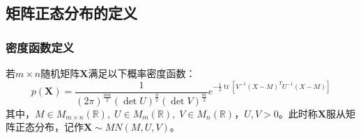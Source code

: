 \subsection{矩阵正态分布的定义}
\subsubsection{密度函数定义}
\begin{definition}\label{def:MatNormal1}
	若$m\times n$随机矩阵$\mathbf{X}$满足以下概率密度函数：
	\begin{equation*}
		p(\mathbf{X})=\frac{1}{(2\pi)^{\frac{mn}{2}}(\det U)^{\frac{n}{2}}(\det V)^{\frac{m}{2}}}e^{-\frac{1}{2}\operatorname{tr}[V^{-1}(X-M)^TU^{-1}(X-M)]}
	\end{equation*}
	其中，$M\in M_{m\times n}(\mathbb{R}),\;U\in M_{m}(\mathbb{R}),\;V\in M_{n}(\mathbb{R})$，$U,V>0$。此时称$\mathbf{X}$服从矩阵正态分布，记作$\mathbf{X}\sim MN(M,U,V)$。
\end{definition}

